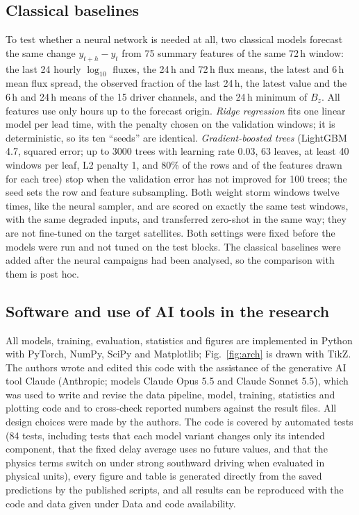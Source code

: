 \documentclass[a4paper,fleqn]{cas-dc}
\begin{document}
\subsection{Classical baselines}
\label{sec:classical}
To test whether a neural network is needed at all, two classical models forecast the same change
\(y_{t+h}-y_t\) from 75 summary features of the same 72\,h window: the last 24 hourly \(\log_{10}\) fluxes, the
24\,h and 72\,h flux means, the latest and 6\,h mean flux spread, the observed fraction of the last 24\,h, the latest
value and the 6\,h and 24\,h means of the 15 driver channels, and the 24\,h minimum of \(B_z\). All features use only
hours up to the forecast origin. \emph{Ridge regression} fits one linear model per lead time, with the penalty
chosen on the validation windows; it is deterministic, so its ten ``seeds'' are identical. \emph{Gradient-boosted
trees} (LightGBM 4.7, squared error; up to 3000 trees with learning rate 0.03, 63 leaves, at least 40 windows per
leaf, L2 penalty 1, and 80\% of the rows and of the features drawn for each tree) stop when the validation error has
not improved for 100 trees; the seed sets the row and feature subsampling. Both weight storm windows twelve times,
like the neural sampler, and are scored on exactly the same test windows, with the same degraded inputs, and
transferred zero-shot in the same way; they are not fine-tuned on the target satellites. Both settings were fixed
before the models were run and not tuned on the test blocks. The classical baselines were added after the neural
campaigns had been analysed, so the comparison with them is post hoc.

\subsection{Software and use of AI tools in the research}
All models, training, evaluation, statistics and figures are implemented in Python with PyTorch, NumPy, SciPy and
Matplotlib; Fig.~\ref{fig:arch} is drawn with TikZ. The authors wrote and edited this code with the assistance of the
generative AI tool Claude (Anthropic; models Claude Opus 5.5 and Claude Sonnet 5.5), which was used to write and
revise the data pipeline, model, training, statistics and plotting code and to cross-check reported numbers against
the result files. All design choices were made by the authors. The code is covered by automated tests (84 tests,
including tests that each model variant changes only its intended component, that the fixed delay average uses no
future values, and that the physics terms switch on under strong southward driving when evaluated in physical
units), every figure and
table is generated directly from the saved predictions by the published scripts, and all results can be reproduced
with the code and data given under Data and code availability.
\end{document}
